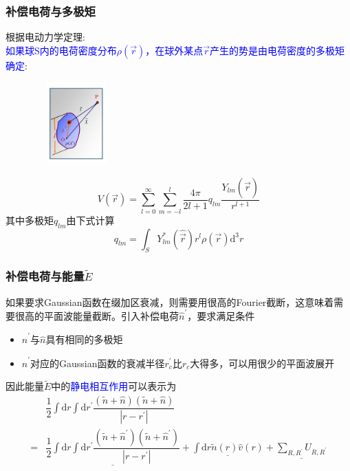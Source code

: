 \frame
{
\frametitle{补偿电荷与多极矩}
根据电动力学定理:\\\textcolor{blue}{如果球\textrm{S}内的电荷密度分布$\rho(\vec r)$，在球外某点$\vec r$产生的势是由电荷密度的多极矩确定}:
\begin{figure}[h!]
\vspace*{-15pt}
\centering
\includegraphics[height=1.25in,width=1.32in,viewport=1 22 507 575,clip]{Figures/potential_multipole.jpg}
\label{Potential-multipole-copy}
\end{figure}
\begin{displaymath}
	V(\vec r)=\sum_{l=0}^{\infty}\sum_{m=-l}^{l}\dfrac{4\pi}{2l+1}q_{lm}\dfrac{Y_{lm}(\hat{\vec r})}{r^{l+1}}
\end{displaymath}
其中多极矩$q_{lm}$由下式计算
\begin{displaymath}
	q_{lm}=\int_SY_{lm}^{\ast}(\hat{\vec r})r^l\rho(\vec r)\mathrm{d}^3r
\end{displaymath}
}

\frame
{
	\frametitle{补偿电荷与能量$\tilde E$}
	如果要求\textrm{Gaussian}函数在缀加区衰减，则需要用很高的\textrm{Fourier}截断，这意味着需要很高的平面波能量截断。引入补偿电荷$\hat n^{\prime}$，要求满足条件
	\begin{itemize}
		\item $\hat n^{\prime}$与$\hat n$具有相同的多极矩
		\item $\hat n^{\prime}$对应的\textrm{Gaussian}函数的衰减半径$r_c^{\prime}$比$r_c$大得多，可以用很少的平面波展开
	\end{itemize}
	因此能量$\tilde E$中的\textcolor{blue}{静电相互作用}可以表示为
	\begin{displaymath}
		\begin{aligned}
			&\dfrac12\int\mathrm{d}r\int\mathrm{d}r^{\prime}\dfrac{(\tilde n+\hat n)(\tilde n+\hat n)}{|r-r^{\prime}|}\\
			=&\underline{\dfrac12\int\mathrm{d}r\int\mathrm{d}r^{\prime}\dfrac{(\tilde n+\hat n^{\prime})(\tilde n+\hat n^{\prime})}{|r-r^{\prime}|}}
			+\underline{\int\mathrm{d}r\tilde n(r)\hat v(r)}+\underline{\sum_{R,R^{\prime}}U_{R,R^{\prime}}}
		\end{aligned}
	\end{displaymath}
}

